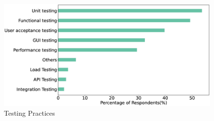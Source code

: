 \begin{figure}[h]
\centering
  \includegraphics[scale=0.2]{Figures/Respondents_testing_practices}
  \caption{Testing Practices}
  \label{fig:testing}
\end{figure}


